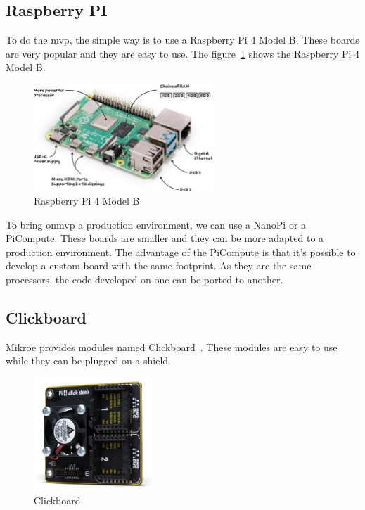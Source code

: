 \subsection{Raspberry PI}
\label{subsec:pi}
To do the \acrshort{mvp}, the simple way is to use a Raspberry Pi 4 Model B\@.
These boards are very popular and they are easy to use.
The figure~\ref{fig:analysis:mcu:pi} shows the Raspberry Pi 4 Model B\@.

\begin{figure}[ht]
  \centering
  \includegraphics[width=0.6\textwidth]{img/raspberry-pi-4}
  \caption{Raspberry Pi 4 Model B~\cite{raspberryPi4}}
  \label{fig:analysis:mcu:pi}
\end{figure}

To bring on\acrshort{mvp} a production environment, we can use a NanoPi or a PiCompute.
These boards are smaller and they can be more adapted to a production environment.
The advantage of the PiCompute is that it's possible to develop a custom board with the same footprint.
As they are the same processors, the code developed on one can be ported to another.


\subsection{Clickboard}
\label{subsec:clickboard}

Mikroe provides modules named Clickboard~\cite{mikroe-shield}.
These modules are easy to use while they can be plugged on a shield.

\begin{figure}[ht]
  \centering
  \includegraphics[width=0.4\textwidth]{img/mikroe-shield}
  \caption{Clickboard~\cite{mikroe-shield}}
  \label{fig:analysis:mcu:clickboard}
\end{figure}

